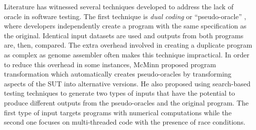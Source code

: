 \documentclass[12pt,\mydriver]{thesis}
\begin{document}
Literature has witnessed several techniques developed to address the lack of oracle in software testing. The first technique is \emph{dual coding}
or ``pseudo-oracle'' \cite{weyuker1982testing}, where developers independently create a program with the same specification as
the original. Identical input datasets are used and outputs from both programs are, then, compared.
The extra overhead involved in creating a duplicate program as complex as genome assembler often makes this technique impractical.
In order to reduce this overhead in some instances,
McMinn \cite{McMinn:2009:SFD:1569901.1570127} proposed program transformation which automatically creates pseudo-oracles
by transforming aspects of the SUT into alternative versions. He also proposed using search-based
testing techniques to generate two types of inputs that have the potential to produce different outputs from the pseudo-oracles and the original program. The first type of input targets programs with numerical computations while the second one focuses on multi-threaded code with the presence of race conditions.
\end{document}
